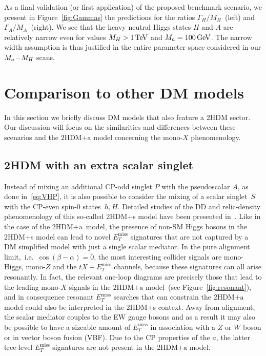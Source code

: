 \documentclass[a4paper, 11pt,notoc]{article}
\newcommand{\MET}{\ensuremath{E_T^\mathrm{miss}}\xspace}
\newcommand{\hdma}{\ensuremath{\textrm{2HDM+a}}\xspace}
\begin{document}
As a final validation (or first application) of the proposed benchmark scenario, we present in  Figure~\ref{fig:Gammas} the predictions for the ratios $\Gamma_H/M_H$~(left) and $\Gamma_A/M_A$~(right). We see that the heavy neutral Higgs states $H$ and $A$ are relatively narrow even for values $M_H > 1 \, {\rm TeV}$ and $M_a = 100 \, {\rm GeV}$.  The narrow width assumption is thus justified in the entire parameter space considered in our $M_a\hspace{0.5mm}$--$\hspace{0.5mm}M_H$ scans. 


\section{Comparison to other DM models}
\label{sec:comparison}

In this section we briefly discuss DM models that also feature a 2HDM sector.  Our discussion will focus on the similarities and differences between these scenarios and the \hdma model  concerning the mono-$X$ phenomenology. 

\subsection{2HDM with an extra scalar singlet}

Instead of mixing an additional CP-odd singlet $P$ with the pseudoscalar $A$, as done in~\eqref{eq:VHP}, it is also possible to consider the mixing of a  scalar singlet~$S$ with  the CP-even spin-0 states~$h,H$. Detailed studies of the DD and relic-density phenomenology of this so-called 2HDM+s model have been presented in~\cite{Bell:2016ekl,Bell:2017rgi}.  Like in the case of the \hdma~model, the presence of  non-SM Higgs bosons in the 2HDM+s model can lead to novel $\MET$ signatures that are not captured by a DM simplified model with just a single scalar mediator. In the pure alignment limit,~i.e.~$\cos ( \beta - \alpha) = 0$, the most interesting collider signals are mono-Higgs, mono-$Z$ and the $t X + \MET$  channels, because  these signatures can all arise resonantly.  In fact, the relevant one-loop diagrams are precisely those that  lead to the leading mono-$X$ signals in the \hdma model~(see Figure~\ref{fig:resonant}), and in consequence resonant $\MET$ searches that can constrain the \hdma model could also be interpreted in the 2HDM+s context. Away from alignment, the scalar mediator couples to the EW gauge bosons and as a result it may also be possible to have a sizeable amount of $\MET$ in association with a $Z$ or $W$ boson or in  vector boson fusion (VBF). Due to the CP properties of the $a$, the latter tree-level $\MET$ signatures are not present in the \hdma model. 
\end{document}
